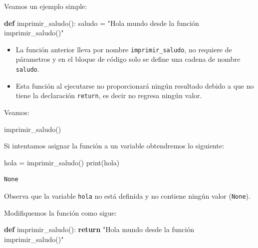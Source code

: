 \documentclass[
  spanish,
  letterpaper,
]{scrbook}
\newenvironment{Shaded}{\begin{snugshade}}{\end{snugshade}}
\newcommand{\BuiltInTok}[1]{\textcolor[rgb]{0.00,0.23,0.31}{#1}}
\newcommand{\ControlFlowTok}[1]{\textcolor[rgb]{0.00,0.23,0.31}{\textbf{#1}}}
\newcommand{\KeywordTok}[1]{\textcolor[rgb]{0.00,0.23,0.31}{\textbf{#1}}}
\newcommand{\NormalTok}[1]{\textcolor[rgb]{0.00,0.23,0.31}{#1}}
\newcommand{\OperatorTok}[1]{\textcolor[rgb]{0.37,0.37,0.37}{#1}}
\newcommand{\StringTok}[1]{\textcolor[rgb]{0.13,0.47,0.30}{#1}}
\theoremstyle{definition}
\theoremstyle{remark}
\begin{document}
Veamos un ejemplo simple:

\begin{Shaded}
\begin{Highlighting}[]
\KeywordTok{def}\NormalTok{ imprimir\_saludo():}
\NormalTok{    saludo }\OperatorTok{=} \StringTok{"Hola mundo desde la función \textquotesingle{}imprimir\_saludo()\textquotesingle{}"}
\end{Highlighting}
\end{Shaded}

\begin{itemize}
\item
  La función anterior lleva por nombre \texttt{imprimir\_saludo}, no
  requiere de párametros y en el bloque de código solo se define una
  cadena de nombre \texttt{saludo}.
\item
  Esta función al ejecutarse no proporcionará ningún resultado debido a
  que no tiene la declaración \texttt{return}, es decir no regresa
  ningún valor.
\end{itemize}

Veamos:

\begin{Shaded}
\begin{Highlighting}[]
\NormalTok{imprimir\_saludo()}
\end{Highlighting}
\end{Shaded}

Si intentamos asignar la función a un variable obtendremos lo siguiente:

\begin{Shaded}
\begin{Highlighting}[]
\NormalTok{hola }\OperatorTok{=}\NormalTok{ imprimir\_saludo()}
\BuiltInTok{print}\NormalTok{(hola)}
\end{Highlighting}
\end{Shaded}

\begin{verbatim}
None
\end{verbatim}

Observa que la variable \texttt{hola} no está definida y no contiene
ningún valor (\texttt{None}).

Modifiquemos la función como sigue:

\begin{Shaded}
\begin{Highlighting}[]
\KeywordTok{def}\NormalTok{ imprimir\_saludo():}
    \ControlFlowTok{return} \StringTok{"Hola mundo desde la función \textquotesingle{}imprimir\_saludo()\textquotesingle{}"}
\end{Highlighting}
\end{Shaded}
\end{document}
